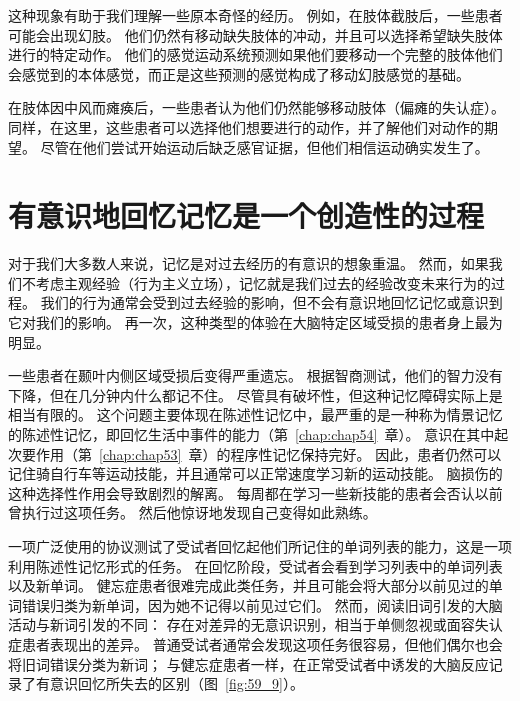 这种现象有助于我们理解一些原本奇怪的经历。
例如，在肢体截肢后，一些患者可能会出现幻肢。
他们仍然有移动缺失肢体的冲动，并且可以选择希望缺失肢体进行的特定动作。
他们的感觉运动系统预测如果他们要移动一个完整的肢体他们会感觉到的本体感觉，而正是这些预测的感觉构成了移动幻肢感觉的基础。


在肢体因中风而瘫痪后，一些患者认为他们仍然能够移动肢体（偏瘫的失认症）。
同样，在这里，这些患者可以选择他们想要进行的动作，并了解他们对动作的期望。
尽管在他们尝试开始运动后缺乏感官证据，但他们相信运动确实发生了。



\section{有意识地回忆记忆是一个创造性的过程}

对于我们大多数人来说，记忆是对过去经历的有意识的想象重温。
然而，如果我们不考虑主观经验（行为主义立场），记忆就是我们过去的经验改变未来行为的过程。
我们的行为通常会受到过去经验的影响，但不会有意识地回忆记忆或意识到它对我们的影响。
再一次，这种类型的体验在大脑特定区域受损的患者身上最为明显。


一些患者在颞叶内侧区域受损后变得严重遗忘。
根据智商测试，他们的智力没有下降，但在几分钟内什么都记不住。
尽管具有破坏性，但这种记忆障碍实际上是相当有限的。
这个问题主要体现在陈述性记忆中，最严重的是一种称为情景记忆的陈述性记忆，即回忆生活中事件的能力（第~\ref{chap:chap54}~章）。
意识在其中起次要作用（第~\ref{chap:chap53}~章）的程序性记忆保持完好。
因此，患者仍然可以记住骑自行车等运动技能，并且通常可以正常速度学习新的运动技能。
脑损伤的这种选择性作用会导致剧烈的解离。
每周都在学习一些新技能的患者会否认以前曾执行过这项任务。
然后他惊讶地发现自己变得如此熟练。


一项广泛使用的协议测试了受试者回忆起他们所记住的单词列表的能力，这是一项利用陈述性记忆形式的任务。
在回忆阶段，受试者会看到学习列表中的单词列表以及新单词。
健忘症患者很难完成此类任务，并且可能会将大部分以前见过的单词错误归类为新单词，因为她不记得以前见过它们。
然而，阅读旧词引发的大脑活动与新词引发的不同：
存在对差异的无意识识别，相当于单侧忽视或面容失认症患者表现出的差异。
普通受试者通常会发现这项任务很容易，但他们偶尔也会将旧词错误分类为新词；
与健忘症患者一样，在正常受试者中诱发的大脑反应记录了有意识回忆所失去的区别（图~\ref{fig:59_9}）。


